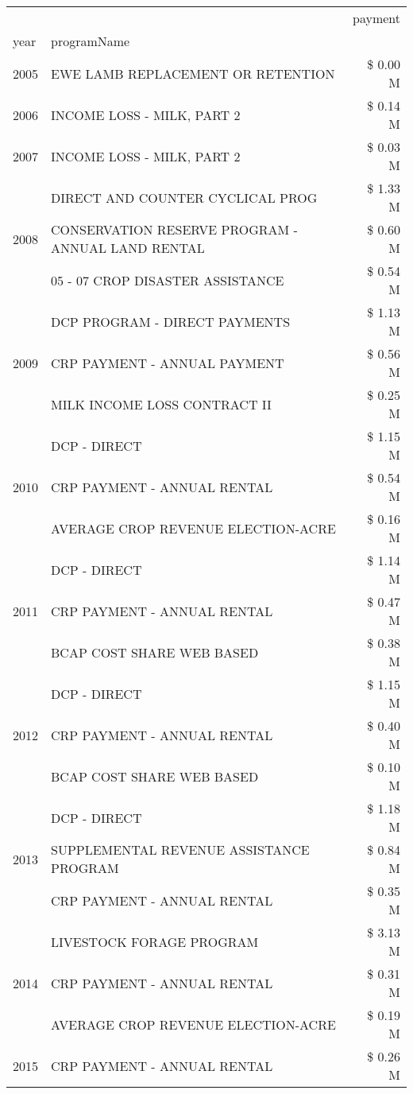\begin{tabular}{llr}
\toprule
 &  & payment \\
year & programName &  \\
\midrule
2005 & EWE LAMB REPLACEMENT OR RETENTION & \$ 0.00 M \\
\cline{1-3}
2006 & INCOME LOSS - MILK, PART 2 & \$ 0.14 M \\
\cline{1-3}
2007 & INCOME LOSS - MILK, PART 2 & \$ 0.03 M \\
\cline{1-3}
\multirow[t]{3}{*}{2008} & DIRECT AND COUNTER CYCLICAL PROG & \$ 1.33 M \\
 & CONSERVATION RESERVE PROGRAM - ANNUAL LAND RENTAL & \$ 0.60 M \\
 & 05 - 07 CROP DISASTER ASSISTANCE & \$ 0.54 M \\
\cline{1-3}
\multirow[t]{3}{*}{2009} & DCP PROGRAM - DIRECT PAYMENTS & \$ 1.13 M \\
 & CRP PAYMENT - ANNUAL PAYMENT & \$ 0.56 M \\
 & MILK INCOME LOSS CONTRACT II & \$ 0.25 M \\
\cline{1-3}
\multirow[t]{3}{*}{2010} & DCP - DIRECT & \$ 1.15 M \\
 & CRP PAYMENT - ANNUAL RENTAL & \$ 0.54 M \\
 & AVERAGE CROP REVENUE ELECTION-ACRE & \$ 0.16 M \\
\cline{1-3}
\multirow[t]{3}{*}{2011} & DCP - DIRECT & \$ 1.14 M \\
 & CRP PAYMENT - ANNUAL RENTAL & \$ 0.47 M \\
 & BCAP COST SHARE WEB BASED & \$ 0.38 M \\
\cline{1-3}
\multirow[t]{3}{*}{2012} & DCP - DIRECT & \$ 1.15 M \\
 & CRP PAYMENT - ANNUAL RENTAL & \$ 0.40 M \\
 & BCAP COST SHARE WEB BASED & \$ 0.10 M \\
\cline{1-3}
\multirow[t]{3}{*}{2013} & DCP - DIRECT & \$ 1.18 M \\
 & SUPPLEMENTAL REVENUE ASSISTANCE PROGRAM & \$ 0.84 M \\
 & CRP PAYMENT - ANNUAL RENTAL & \$ 0.35 M \\
\cline{1-3}
\multirow[t]{3}{*}{2014} & LIVESTOCK FORAGE PROGRAM & \$ 3.13 M \\
 & CRP PAYMENT - ANNUAL RENTAL & \$ 0.31 M \\
 & AVERAGE CROP REVENUE ELECTION-ACRE & \$ 0.19 M \\
\cline{1-3}
\multirow[t]{3}{*}{2015} & CRP PAYMENT - ANNUAL RENTAL & \$ 0.26 M \\

\end{tabular}
